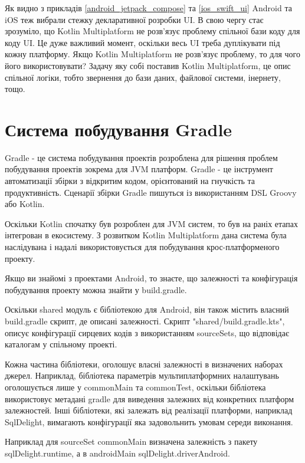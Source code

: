Як видно з прикладів \ref{android_jetpack_compose} та \ref{ios_swift_ui} Android та iOS теж вибрали стежку декларативної розробки UI.
В свою чергу стає зрозуміло, що Kotlin Multiplatform не розв'язує проблему спільної бази коду для коду UI.
Це дуже важливий момент, оскільки весь UI треба дуплікувати під кожну платформу.
Якщо Kotlin Multiplatform не розв'язує проблему, то для чого його використовувати?
Задачу яку собі поставив Kotlin Multiplatform, це опис спільної логіки, тобто звернення до бази даних, файлової системи, інернету, тощо.


\section{Система побудування Gradle}
\label{section.2.9}

Gradle - це система побудування проектів розроблена для рішення проблем побудування проектів зокрема для JVM платформ.
Gradle - це інструмент автоматизації збірки з відкритим кодом, орієнтований на гнучкість та продуктивність. \cite{gradle_user_manual}
Сценарії збірки Gradle пишуться із використанням DSL Groovy або Kotlin. \cite{gradle_user_manual}

Оскільки Kotlin спочатку був розроблен для JVM систем, то був на раніх етапах інтегрован в екосистему.
З розвитком Kotlin Multiplatform дана система була наслідувана і надалі використовується для побудування крос-платформеного проекту.

Якщо ви знайомі з проектами Android, то знаєте, що залежності та конфігурація побудування проекту можна знайти у build.gradle.

Оскільки shared модуль є бібліотекою для Android, він також містить власний build.gradle скрипт, де описані залежності.
Скрипт "shared/build.gradle.kts", описує конфігурації сирцевих кодів з використанням sourceSets, що відповідає каталогам у спільному проекті.

Кожна частина бібліотеки, оголошує власні залежності в визначених наборах джерел.
Наприклад, бібліотека параметрів мультиплатформних налаштувань оголошується лише у commonMain та commonTest,
оскільки бібліотека використовує метадані gradle для виведення залежних від конкретних платформ залежностей.
Інші бібліотеки, які залежать від реалізації платформи, наприклад SqlDelight, вимагають конфігурації яка задовольнить
умовам середи виконання.

Наприклад для sourceSet commonMain визначена залежність з пакету sqlDelight.runtime, а в androidMain sqlDelight.driverAndroid.


